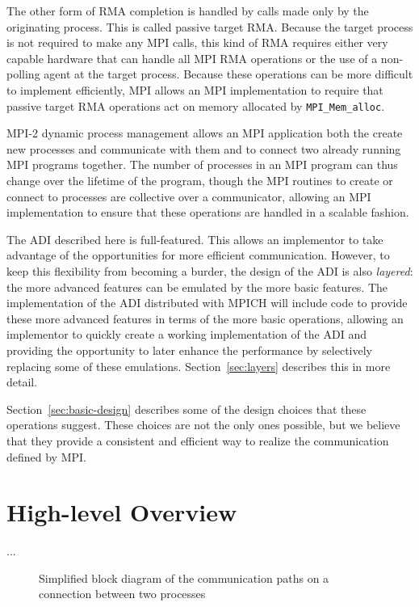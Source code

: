 \documentclass{article}
\def\code#1{\texttt{#1}}
\begin{document}
The other form of RMA completion is handled by calls made only by the
originating process.  This is called passive target RMA.  Because the
target process is not required to make any MPI calls, this kind of RMA
requires either very capable hardware that can handle all MPI RMA
operations or the use of a non-polling agent at the target process.
Because these operations can be more difficult to implement
efficiently, MPI allows an MPI implementation to require that passive
target RMA operations act on memory allocated by
\code{MPI_Mem_alloc}.  

MPI-2 dynamic process management allows an MPI application both the
create new processes and communicate with them and to connect two
already running MPI programs together.  The number of processes in an
MPI program can thus change over the lifetime of the program, though
the MPI routines to create or connect to processes are collective over
a communicator, allowing an MPI implementation to ensure that these
operations are handled in a scalable fashion.

The ADI described here is full-featured.  This allows an implementor
to take advantage of the opportunities for more efficient
communication.  However, to keep this flexibility from becoming a
burder, the design of the ADI is also \emph{layered}: the more
advanced features can be emulated by the more basic features.  The
implementation of the ADI distributed with MPICH will include code to
provide these more advanced features in terms of the more basic
operations, allowing an implementor to quickly create a working
implementation of the ADI and providing the opportunity to later
enhance the performance by selectively replacing some of these
emulations.  Section~\ref{sec:layers} describes this in more detail.

Section~\ref{sec:basic-design} describes some of the design choices that these
operations suggest.  These choices are not the only ones possible, but
we believe that they provide a consistent and efficient way to realize
the communication defined by MPI.

\section{High-level Overview}
\label{sec:high-level}
...

\begin{figure}
\centerline{}
\caption{Simplified block diagram of the communication paths on a connection
  between two processes} 
\label{fig:adi-overview}
\end{figure}
\end{document}
